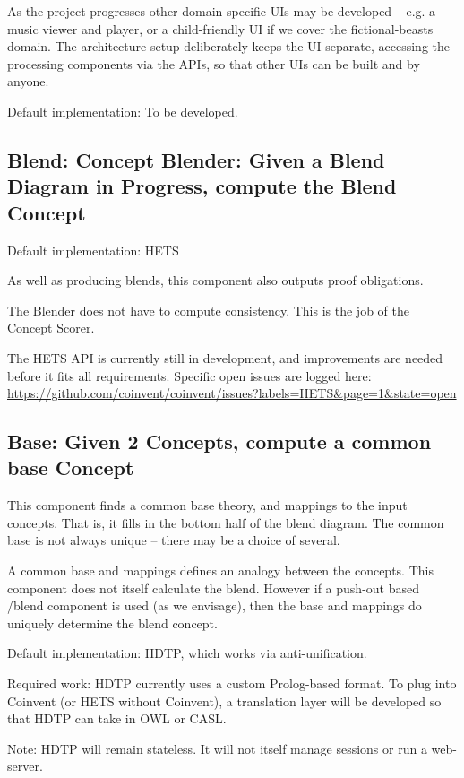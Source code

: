 \documentclass[10pt]{article}
\begin{document}
As the project progresses other domain-specific UIs may be developed -- e.g. a music viewer and player, 
or a child-friendly UI if we cover the fictional-beasts domain. 
The architecture setup deliberately keeps the UI separate, accessing the processing components via the APIs, so that other UIs can be built and by anyone.

Default implementation: To be developed.

\subsection{Blend: Concept Blender: Given a Blend Diagram in Progress, compute the Blend Concept}

Default implementation: HETS

As well as producing blends, this component also outputs proof obligations.

The Blender does not have to compute consistency. This is the job of the Concept Scorer.

The HETS API is currently still in development, and improvements are needed
before it fits all requirements. Specific open issues are logged here: \url{https://github.com/coinvent/coinvent/issues?labels=HETS&page=1&state=open}

\subsection{Base: Given 2 Concepts, compute a common base Concept}

This component finds a common base theory, and mappings to the input concepts. That is,
it fills in the bottom half of the blend diagram. 
The common base is not always unique -- there may be a choice of several.

A common base and mappings defines an analogy between the concepts. This component does not itself calculate the blend. However if a push-out based /blend component is used (as we envisage), then the base and mappings do uniquely determine the blend concept.

Default implementation: HDTP, which works via anti-unification.

Required work: HDTP currently uses a custom Prolog-based format. To plug into Coinvent (or HETS without Coinvent), a translation layer will be developed so that HDTP can take in OWL or CASL.

Note: HDTP will remain stateless. It will not itself manage sessions or run a web-server.
\end{document}
